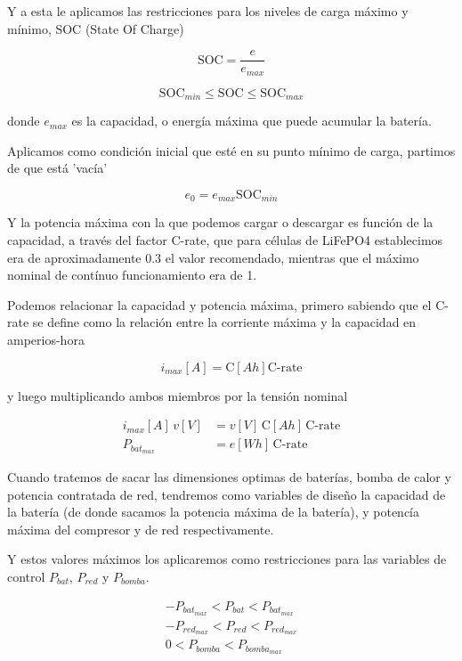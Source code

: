 Y a esta le aplicamos las restricciones para los niveles de carga máximo y
mínimo, SOC (State Of Charge)

\begin{equation}
	\text{SOC} = \frac{e}{e_{max}}
\end{equation}

\begin{equation}
	\text{SOC}_{min} \leq \text{SOC} \leq \text{SOC}_{max}
\end{equation}

donde $e_{max}$ es la capacidad, o energía máxima que puede acumular la batería.

Aplicamos como condición inicial que esté en su punto mínimo de carga, partimos
de que está 'vacía'

\begin{equation}
	e_0 = e_{max} \text{SOC}_{min}
\end{equation}

Y la potencia máxima con la que podemos cargar o descargar es función de la capacidad,
a través del factor C-rate, que para células de LiFePO4 establecimos era de aproximadamente
0.3 el valor recomendado, mientras que el máximo nominal de contínuo funcionamiento era de 1.

Podemos relacionar la capacidad y potencia máxima, primero sabiendo que
el C-rate se define como la relación entre la corriente máxima y la capacidad en amperios-hora

\begin{equation}
  i_{max}[A] = \text{C}[Ah] \text{C-rate}
\end{equation}

y luego multiplicando ambos miembros por la tensión nominal

\begin{align}
  i_{max}[A] \, v[V] &= v[V] \, \text{C}[Ah] \, \text{C-rate} \\
  P_{bat_{max}} &= e[Wh] \, \text{C-rate}
\end{align}

Cuando tratemos de sacar las dimensiones optimas de baterías, bomba de calor y
potencia contratada de red, tendremos como variables de diseño la capacidad de
la batería (de donde sacamos la potencia máxima de la batería), y potencía
máxima del compresor y de red respectivamente.

Y estos valores máximos los aplicaremos como restricciones para las variables
de control $P_{bat}$, $P_{red}$ y $P_{bomba}$.

\begin{align}
  -P_{bat_{max}} < P_{bat} < P_{bat_{max}} \\
  -P_{red_{max}} < P_{red} < P_{red_{max}} \\
  0 < P_{bomba} < P_{bomba_{max}}
\end{align}
